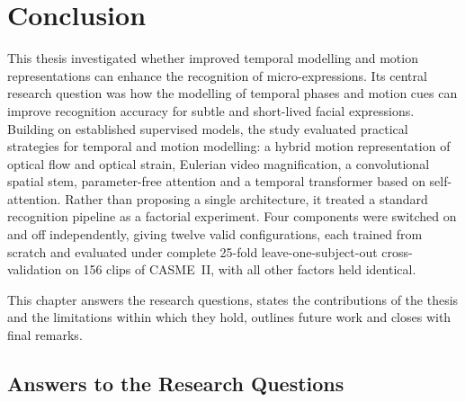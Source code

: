 %

\chapter{Conclusion}
\label{ch:conclusion}

This thesis investigated whether improved temporal modelling and motion representations can enhance the recognition of micro-expressions. Its central research question was how the modelling of temporal phases and motion cues can improve recognition accuracy for subtle and short-lived facial expressions. Building on established supervised models, the study evaluated practical strategies for temporal and motion modelling: a hybrid motion representation of optical flow and optical strain, Eulerian video magnification, a convolutional spatial stem, parameter-free attention and a temporal transformer based on self-attention. Rather than proposing a single architecture, it treated a standard recognition pipeline as a factorial experiment. Four components were switched on and off independently, giving twelve valid configurations, each trained from scratch and evaluated under complete 25-fold leave-one-subject-out cross-validation on 156 clips of CASME~II, with all other factors held identical.

This chapter answers the research questions, states the contributions of the thesis and the limitations within which they hold, outlines future work and closes with final remarks.


\section{Answers to the Research Questions}
\label{sec:rq-answers}

